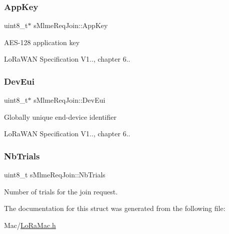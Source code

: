\subsubsection{\texorpdfstring{App\+Key}{AppKey}}
{\footnotesize\ttfamily uint8\+\_\+t$\ast$ s\+Mlme\+Req\+Join\+::\+App\+Key}

A\+E\+S-\/128 application key

Lo\+Ra\+W\+AN Specification V1.., chapter 6.. \mbox{\label{structsMlmeReqJoin_abd56390965a0e3a80e198d9ae39d1625}} 
\subsubsection{\texorpdfstring{Dev\+Eui}{DevEui}}
{\footnotesize\ttfamily uint8\+\_\+t$\ast$ s\+Mlme\+Req\+Join\+::\+Dev\+Eui}

Globally unique end-\/device identifier

Lo\+Ra\+W\+AN Specification V1.., chapter 6.. \mbox{\label{structsMlmeReqJoin_aa01aa1a2d54c6b90e7d972c28306a6e4}} 
\subsubsection{\texorpdfstring{Nb\+Trials}{NbTrials}}
{\footnotesize\ttfamily uint8\+\_\+t s\+Mlme\+Req\+Join\+::\+Nb\+Trials}

Number of trials for the join request. 

The documentation for this struct was generated from the following file\+:\begin{DoxyCompactItemize}
\item 
Mac/\hyperlink{LoRaMac_8h}{Lo\+Ra\+Mac.\+h}\end{DoxyCompactItemize}
